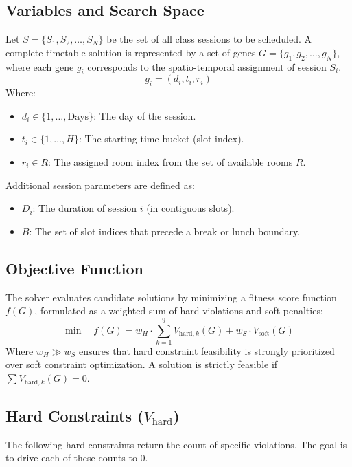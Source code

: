 \documentclass[11pt, a4paper]{article}
\begin{document}
\subsection{Variables and Search Space}
Let $S = \{S_1, S_2, \dots, S_N\}$ be the set of all class sessions to be scheduled. A complete timetable solution is represented by a set of genes $G = \{g_1, g_2, \dots, g_N\}$, where each gene $g_i$ corresponds to the spatio-temporal assignment of session $S_i$.
\[
g_i = (d_i, t_i, r_i)
\]
Where:
\begin{itemize}
    \item $d_i \in \{1, \dots, \text{Days}\}$: The day of the session.
    \item $t_i \in \{1, \dots, H\}$: The starting time bucket (slot index).
    \item $r_i \in R$: The assigned room index from the set of available rooms $R$.
\end{itemize}
Additional session parameters are defined as:
\begin{itemize}
    \item $D_i$: The duration of session $i$ (in contiguous slots).
    \item $B$: The set of slot indices that precede a break or lunch boundary.
\end{itemize}

\subsection{Objective Function}
The solver evaluates candidate solutions by minimizing a fitness score function $f(G)$, formulated as a weighted sum of hard violations and soft penalties:
\[
\min \quad f(G) = w_H \cdot \sum_{k=1}^{9} V_{\text{hard}, k}(G) + w_S \cdot V_{\text{soft}}(G)
\]
Where $w_H \gg w_S$ ensures that hard constraint feasibility is strongly prioritized over soft constraint optimization. A solution is strictly feasible if $\sum V_{\text{hard}, k}(G) = 0$.

\subsection{Hard Constraints ($V_{\text{hard}}$)}
The following hard constraints return the count of specific violations. The goal is to drive each of these counts to $0$.
\end{document}
